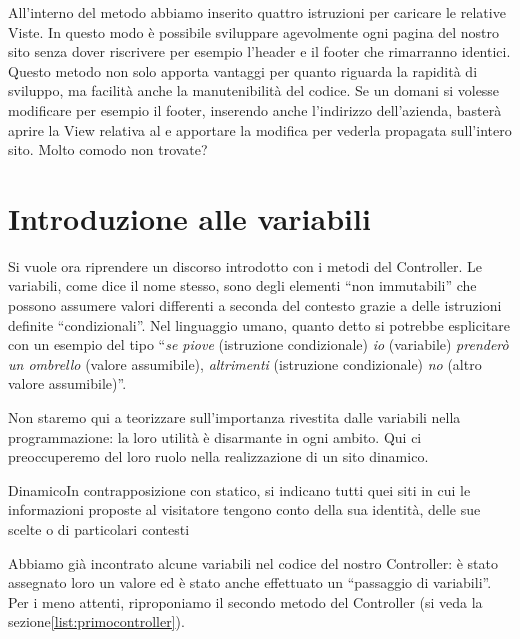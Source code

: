 All'interno del metodo  abbiamo inserito quattro istruzioni per caricare le relative Viste. In questo modo è possibile sviluppare agevolmente ogni pagina del nostro sito senza dover riscrivere per esempio l'header e il footer che rimarranno identici. Questo metodo non solo apporta vantaggi per quanto riguarda la rapidità di sviluppo, ma facilità anche la manutenibilità del codice. Se un domani si volesse modificare per esempio il footer, inserendo anche l'indirizzo dell'azienda, basterà aprire la View relativa al  e apportare la modifica per vederla propagata sull'intero sito. Molto comodo non trovate?

\label{sec:passaggio}
\section*{Introduzione alle variabili}
Si vuole ora riprendere un discorso introdotto con i metodi del Controller. Le variabili, come dice il nome stesso, sono degli elementi ``non immutabili'' che possono assumere valori differenti a seconda del contesto grazie a delle istruzioni definite ``condizionali''. Nel linguaggio umano, quanto detto si potrebbe esplicitare con un esempio del tipo ``\emph{se piove} (istruzione condizionale)  \emph{io} (variabile) \emph{prenderò un ombrello} (valore assumibile),\emph{ altrimenti} (istruzione condizionale) \emph{no} (altro valore assumibile)''.

Non staremo qui a teorizzare sull'importanza rivestita dalle variabili nella programmazione: la loro utilità è disarmante in ogni ambito. Qui ci preoccuperemo del loro ruolo nella realizzazione di un sito dinamico.

\begin{deftab}{Dinamico}{In contrapposizione con statico, si indicano tutti quei siti in cui le informazioni proposte al visitatore tengono conto della sua identità, delle sue scelte o di particolari contesti}
\end{deftab}

Abbiamo già incontrato alcune variabili nel codice del nostro Controller: è stato assegnato loro un valore ed è stato anche effettuato un ``passaggio di variabili''. Per i meno attenti, riproponiamo il secondo metodo del Controller  (si veda la sezione\vref{list:primocontroller}).



